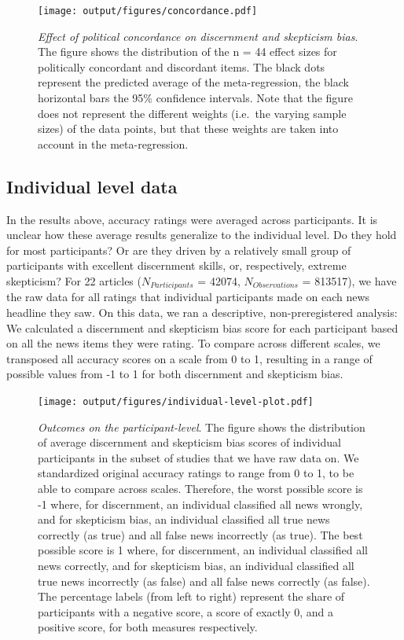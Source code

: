 \documentclass[
  doc,floatsintext]{apa6}
\begin{document}
\begin{figure}
\centering
\texttt{[image: output/figures/concordance.pdf]}
\caption{\label{fig:concordance}\emph{Effect of political concordance on discernment and skepticism bias}. The figure shows the distribution of the n = 44 effect sizes for politically concordant and discordant items. The black dots represent the predicted average of the meta-regression, the black horizontal bars the 95\% confidence intervals. Note that the figure does not represent the different weights (i.e.~the varying sample sizes) of the data points, but that these weights are taken into account in the meta-regression.}
\end{figure}

\subsection{Individual level data}\label{individual-level-data}

In the results above, accuracy ratings were averaged across participants. It is unclear how these average results generalize to the individual level. Do they hold for most participants? Or are they driven by a relatively small group of participants with excellent discernment skills, or, respectively, extreme skepticism? For 22 articles (\(N_{Participants}\) = 42074, \(N_{Observations}\) = 813517), we have the raw data for all ratings that individual participants made on each news headline they saw. On this data, we ran a descriptive, non-preregistered analysis: We calculated a discernment and skepticism bias score for each participant based on all the news items they were rating. To compare across different scales, we transposed all accuracy scores on a scale from 0 to 1, resulting in a range of possible values from -1 to 1 for both discernment and skepticism bias.



\begin{figure}
\centering
\texttt{[image: output/figures/individual-level-plot.pdf]}
\caption{\label{fig:individual-level-plot}\emph{Outcomes on the participant-level}. The figure shows the distribution of average discernment and skepticism bias scores of individual participants in the subset of studies that we have raw data on. We standardized original accuracy ratings to range from 0 to 1, to be able to compare across scales. Therefore, the worst possible score is -1 where, for discernment, an individual classified all news wrongly, and for skepticism bias, an individual classified all true news correctly (as true) and all false news incorrectly (as true). The best possible score is 1 where, for discernment, an individual classified all news correctly, and for skepticism bias, an individual classified all true news incorrectly (as false) and all false news correctly (as false). The percentage labels (from left to right) represent the share of participants with a negative score, a score of exactly 0, and a positive score, for both measures respectively.}
\end{figure}
\end{document}
